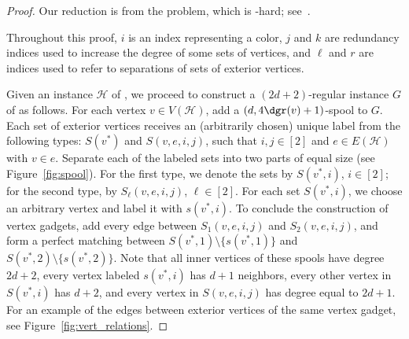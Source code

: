 \begin{proof}
    Our reduction is from the  problem, which is \NP-hard; see~\cite{lovasz_hypergraph}. %


    Throughout this proof, $i$ is an index representing a color, $j$ and $k$ are redundancy indices used to increase the degree of some sets of vertices, and $\ell$ and $r$ are indices used to refer to separations of sets of exterior vertices.

    Given an instance $\mathcal{H}$ of , we proceed to construct a $(2d+2)$-regular instance $G$ of  as follows. For each vertex $v \in V(\mathcal{H})$, add a $(d,4\dgr(v) + 1)$-spool to $G$.
    Each set of exterior vertices receives an (arbitrarily chosen) unique label from the following types: $S(v^*)$ and $S(v, e, i, j)$, such that $i,j \in [2]$ and $e \in E(\mathcal{H})$ with $v \in e$.
    Separate each of the labeled sets into two parts of equal size (see Figure~\ref{fig:spool}).
    For the first type, we denote the sets by $S(v^*, i)$, $i \in [2]$; for the second type, by $S_{\ell}(v, e, i, j)$, $\ell \in [2]$.
    For each set $S(v^*, i)$, we choose an arbitrary vertex and label it with $s(v^*, i)$.
    To conclude the construction of vertex gadgets, add every edge between $S_1(v, e, i, j)$ and $S_2(v, e, i, j)$, and form a perfect matching between $S(v^*, 1) \setminus \{s(v^*, 1)\}$ and $S(v^*, 2) \setminus \{s(v^*, 2)\}$.
    Note that all inner vertices of these spools have degree $2d+2$, every vertex labeled $s(v^*, i)$ has $d+1$ neighbors, every other vertex in $S(v^*, i)$ has $d+2$, and every vertex in $S(v, e, i, j)$ has degree equal to $2d+1$.
    For an example of the edges between exterior vertices of the same vertex gadget, see Figure~\ref{fig:vert_relations}.


\end{proof}
